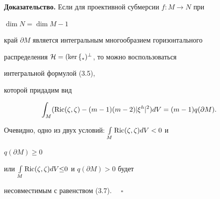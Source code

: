  


{\bf Доказательство.} Если для проективной субмерсии $f:M\to N$ при 


$\dim N=\dim M-1$ 


край $\partial M$ является интегральным многообразием горизонтального 


распределения $\cal H=(\ker f_*)^\bot$, то можно воспользоваться 


интегральной формулой (3.5), 


которой придадим вид 


\begin{equation} 


\int_M(\Ric(\zeta,\zeta)-(m-1)(m-2)|\xi^h|^2)dV= 


(m-1)q(\partial M). 


\end{equation} 


Очевидно, одно из двух условий: $\int\limits_M\operatorname{Ric}(\zeta,\zeta)dV<0$ и 


$q(\partial M){\ge} 0$ 


или $\int\limits_M\operatorname{Ric}(\zeta,\zeta)dV{\le} 0$ и $q(\partial M)>0$ будет 


несовместимым с равенством (3.7). $\quad\square$


 


